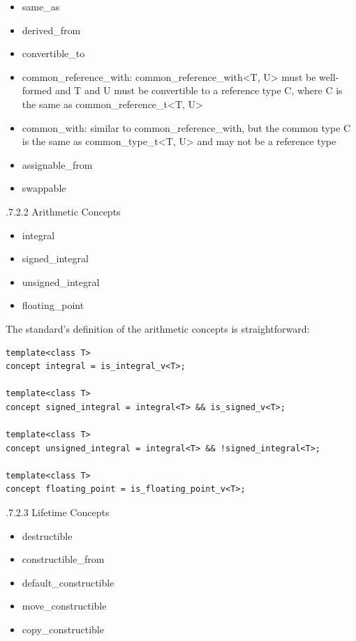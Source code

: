 \begin{itemize}
\item 
same\_as

\item 
derived\_from

\item 
convertible\_to

\item 
common\_reference\_with: common\_reference\_with<T, U> must be well-formed and T and U must be convertible to a reference type C, where C is the same as common\_reference\_t<T, U>

\item 
common\_with: similar to common\_reference\_with, but the common type C is the same as common\_type\_t<T, U> and may not be a reference type

\item 
assignable\_from

\item 
swappable
\end{itemize}

.7.2.2\hspace{0.2cm} Arithmetic Concepts

\begin{itemize}
\item 
integral

\item 
signed\_integral

\item 
unsigned\_integral

\item 
floating\_point
\end{itemize}

The standard’s definition of the arithmetic concepts is straightforward:

\begin{lstlisting}[style=styleCXX]
template<class T>
concept integral = is_integral_v<T>;

template<class T>
concept signed_integral = integral<T> && is_signed_v<T>;

template<class T>
concept unsigned_integral = integral<T> && !signed_integral<T>;

template<class T>
concept floating_point = is_floating_point_v<T>;
\end{lstlisting}

.7.2.3\hspace{0.2cm} Lifetime Concepts

\begin{itemize}
\item 
destructible

\item 
constructible\_from

\item 
default\_constructible

\item 
move\_constructible

\item 
copy\_constructible
\end{itemize}


